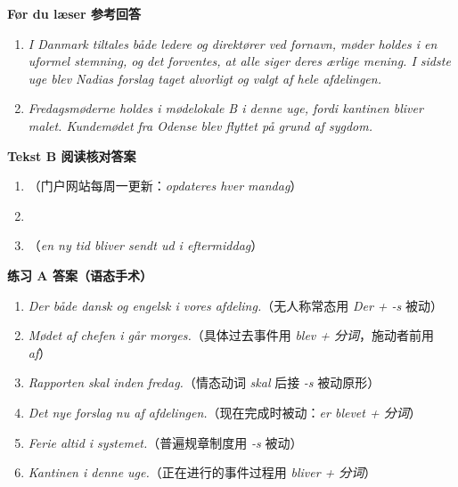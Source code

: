 \begin{answerbox}
\textbf{Før du læser 参考回答}
\begin{enumerate}
  \item \textit{I Danmark tiltales både ledere og direktører ved fornavn, møder holdes i en uformel stemning, og det forventes, at alle siger deres ærlige mening. I sidste uge blev Nadias forslag taget alvorligt og valgt af hele afdelingen.}
  \item \textit{Fredagsmøderne holdes i mødelokale B i denne uge, fordi kantinen bliver malet. Kundemødet fra Odense blev flyttet på grund af sygdom.}
\end{enumerate}

\textbf{Tekst B 阅读核对答案}
\begin{enumerate}
  \item {}（门户网站每周一更新：\textit{opdateres hver mandag}）
  \item {}
  \item {}（\textit{en ny tid bliver sendt ud i eftermiddag}）
\end{enumerate}

\textbf{练习 A 答案（语态手术）}
\begin{enumerate}
  \item \textit{Der  både dansk og engelsk i vores afdeling.}（无人称常态用 \textit{Der + -s} 被动）
  \item \textit{Mødet  af chefen i går morges.}（具体过去事件用 \textit{blev + 分词}，施动者前用 \textit{af}）
  \item \textit{Rapporten skal  inden fredag.}（情态动词 \textit{skal} 后接 \textit{-s} 被动原形）
  \item \textit{Det nye forslag  nu  af afdelingen.}（现在完成时被动：\textit{er blevet + 分词}）
  \item \textit{Ferie  altid i systemet.}（普遍规章制度用 \textit{-s} 被动）
  \item \textit{Kantinen  i denne uge.}（正在进行的事件过程用 \textit{bliver + 分词}）
\end{enumerate}


\end{answerbox}
